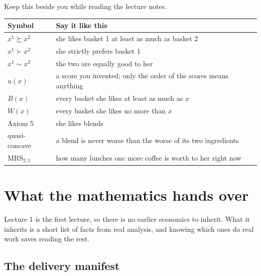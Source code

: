 \documentclass[11pt,letterpaper]{article}
\theoremstyle{definition}
\theoremstyle{plain}
\newcommand{\wpref}{\succsim}
\newcommand{\spref}{\succ}
\newcommand{\indif}{\sim}
\newcommand{\MRS}{\mathrm{MRS}}
\begin{document}
Keep this beside you while reading the lecture notes.

\begin{center}
\begin{tabular}{@{}ll@{}}
\toprule
\textbf{Symbol} & \textbf{Say it like this} \\
\midrule
$x^1 \wpref x^2$ & she likes basket 1 at least as much as basket 2 \\
$x^1 \spref x^2$ & she strictly prefers basket 1 \\
$x^1 \indif x^2$ & the two are equally good to her \\
$u(x)$ & a score you invented; only the order of the scores means anything \\
$B(x)$ & every basket she likes at least as much as $x$ \\
$W(x)$ & every basket she likes no more than $x$ \\
Axiom 5 & she likes blends \\
quasi-concave & a blend is never worse than the worse of its two ingredients \\
$\MRS_{2,1}$ & how many lunches one more coffee is worth to her right now \\
\bottomrule
\end{tabular}
\end{center}

\section{What the mathematics hands over}

Lecture 1 is the first lecture, so there is no earlier economics to inherit. What it inherits is a
short list of facts from real analysis, and knowing which ones do real work saves reading the rest.

\subsection{The delivery manifest}
\end{document}
